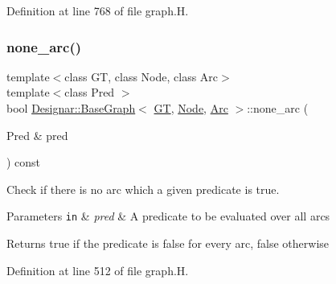 Definition at line 768 of file graph.\+H.

\mbox{\label{class_designar_1_1_base_graph_a023f28dd8824ba7a0c26342effd0fddf}} 
\subsubsection{\texorpdfstring{none\+\_\+arc()}{none\_arc()}\hspace{0.1cm}{\footnotesize\ttfamily [1/2]}}
{\footnotesize\ttfamily template$<$class GT, class Node, class Arc$>$ \\
template$<$class Pred $>$ \\
bool \hyperlink{class_designar_1_1_base_graph}{Designar\+::\+Base\+Graph}$<$ \hyperlink{demo-buildgraph_8_c_a3001c40d2c31ca87ed96cd7d1334a55e}{GT}, \hyperlink{namespace_designar_a5af326c65aa2bd26b26c410f2030d09e}{Node}, \hyperlink{namespace_designar_a3f55fb5513d62ff47cbc8f72b8e95d6f}{Arc} $>$\+::none\+\_\+arc (\begin{DoxyParamCaption}\item[{Pred \&}]{pred }\end{DoxyParamCaption}) const\hspace{0.3cm}{\ttfamily [inline]}}



Check if there is no arc which a given predicate is true. 


\begin{DoxyParams}[1]{Parameters}
\mbox{\tt in}  & {\em pred} & A predicate to be evaluated over all arcs \\
\hline
\end{DoxyParams}
\begin{DoxyReturn}{Returns}
{\ttfamily true} if the predicate is false for every arc, {\ttfamily false} otherwise 
\end{DoxyReturn}


Definition at line 512 of file graph.\+H.

\mbox{\label{class_designar_1_1_base_graph_a69c4841b8c517a510d738bc1204da7b7}} 

